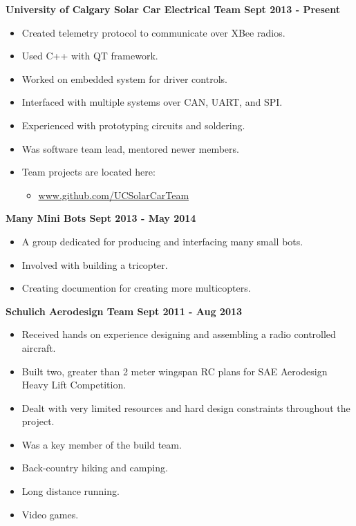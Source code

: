 \documentclass[12pt]{article}
\begin{document}
\noindent \centerline{\bf University of Calgary Solar Car Electrical Team \hfill Sept 2013 - Present}
\begin{itemize}
  \item Created telemetry protocol to communicate over XBee radios.
  \item Used C++ with QT framework.
  \item Worked on embedded system for driver controls.
  \item Interfaced with multiple systems over CAN, UART, and SPI.
  \item Experienced with prototyping circuits and soldering.
  \item Was software team lead, mentored newer members.
  \item Team projects are located here:
\begin{itemize}
  \item \url{www.github.com/UCSolarCarTeam}
\end{itemize}
\end{itemize}

\noindent \centerline{\bf Many Mini Bots \hfill Sept 2013 - May 2014}
\begin{itemize}
  \item A group dedicated for producing and interfacing many small bots.
  \item Involved with building a tricopter.
  \item Creating documention for creating more multicopters.
\end{itemize}

\noindent \centerline{ \bf Schulich Aerodesign Team \hfill Sept 2011 - Aug 2013}
\begin{itemize}
  \item Received hands on experience  designing and assembling a radio controlled aircraft.
  \item Built two, greater than 2 meter wingspan RC plans for SAE Aerodesign Heavy Lift Competition.
  \item Dealt with very limited resources and hard design constraints throughout the project.
  \item Was a key member of the build team.
\end{itemize}

\bigskip
{}
\medskip
\begin{itemize}
\item Back-country hiking and camping.
\item Long distance running.
\item Video games.
\end{itemize}
\bigskip
\end{document}
